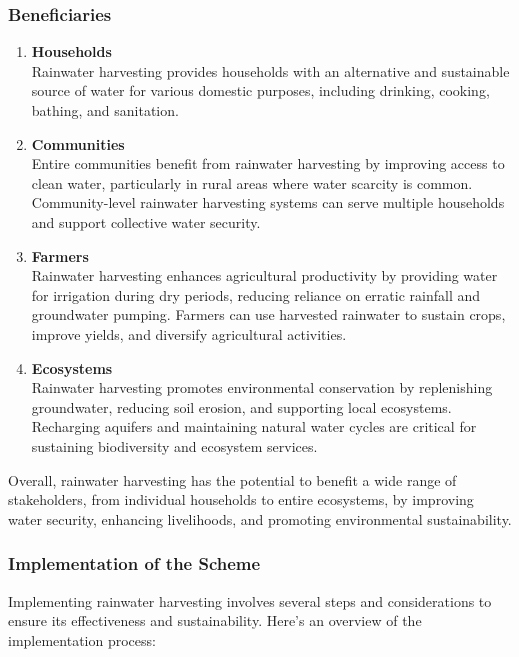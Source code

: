 \documentclass[12pt]{article}
\begin{document}
	\subsubsection{Beneficiaries}
	\begin{enumerate}[label=\textbf{\arabic*.}]
		\item \textbf{Households} \\
		Rainwater harvesting provides households with an alternative and sustainable source of water for various domestic purposes, including drinking, cooking, bathing, and sanitation.

		\item \textbf{Communities} \\
		Entire communities benefit from rainwater harvesting by improving access to clean water, particularly in rural areas where water scarcity is common. Community-level rainwater harvesting systems can serve multiple households and support collective water security.

		\item \textbf{Farmers} \\
		Rainwater harvesting enhances agricultural productivity by providing water for irrigation during dry periods, reducing reliance on erratic rainfall and groundwater pumping. Farmers can use harvested rainwater to sustain crops, improve yields, and diversify agricultural activities.

		\item \textbf{Ecosystems} \\
		Rainwater harvesting promotes environmental conservation by replenishing groundwater, reducing soil erosion, and supporting local ecosystems. Recharging aquifers and maintaining natural water cycles are critical for sustaining biodiversity and ecosystem services.
	\end{enumerate}

	\par Overall, rainwater harvesting has the potential to benefit a wide range of stakeholders, from individual households to entire ecosystems, by improving water security, enhancing livelihoods, and promoting environmental sustainability.  \newpage

	\subsubsection{Implementation of the Scheme}
	\par Implementing rainwater harvesting involves several steps and considerations to ensure its effectiveness and sustainability. Here's an overview of the implementation process:
\end{document}

